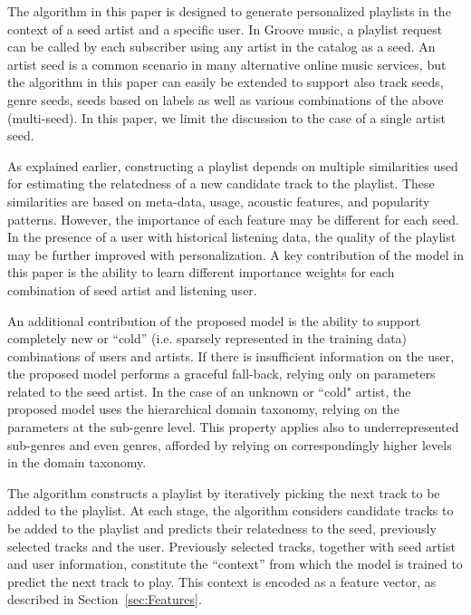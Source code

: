 \label{sec:OurModel}
The algorithm in this paper is designed to generate personalized playlists in the context of a seed artist and a specific user. In Groove music, a playlist request can be called by each subscriber using any artist in the catalog as a seed. An artist seed is a common scenario in many alternative online music services, but the algorithm in this paper can easily be extended to support also track seeds, genre seeds, seeds based on labels as well as various combinations of the above (multi-seed). In this paper, we limit the discussion to the case of a single artist seed.

As explained earlier, constructing a playlist depends on multiple similarities used for estimating the relatedness of a new candidate track to the playlist. These similarities are based on meta-data, usage, acoustic features, and popularity patterns. 
However, the importance of each feature may be different for each seed. 
In the presence of a user with historical listening data, the quality of the playlist may be further improved with personalization. 
A key contribution of the model in this paper is the ability to learn different importance weights for each combination of seed artist and listening user. 

An additional contribution of the proposed model is the ability to support completely new or ``cold'' (i.e. sparsely represented in the training data) combinations of users and artists. If there is insufficient information on the user, the proposed model performs a graceful fall-back, relying only on parameters related to the seed artist. In the case of an unknown or ``cold" artist, the proposed model uses the hierarchical domain taxonomy, relying on the parameters at the sub-genre level. This property applies also to underrepresented sub-genres and even genres, afforded by relying on correspondingly higher levels in the domain taxonomy. 


The algorithm constructs a playlist by iteratively picking the next track to be added to the playlist. 
At each stage, the algorithm considers candidate tracks to be added to the playlist and predicts their relatedness to the seed, previously selected tracks and the user. 
Previously selected tracks, together with seed artist and user information, constitute the ``context'' from which the model is trained to predict the next track to play. This context is encoded as a feature vector, as described in Section~\ref{sec:Features}.  

